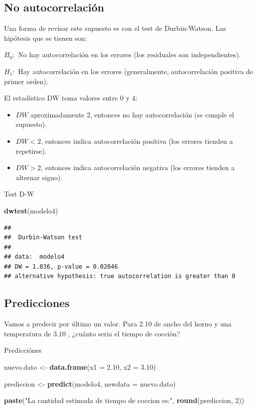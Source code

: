 \documentclass[
]{book}
\newenvironment{Shaded}{\begin{snugshade}}{\end{snugshade}}
\newcommand{\AttributeTok}[1]{\textcolor[rgb]{0.13,0.29,0.53}{#1}}
\newcommand{\DecValTok}[1]{\textcolor[rgb]{0.00,0.00,0.81}{#1}}
\newcommand{\FloatTok}[1]{\textcolor[rgb]{0.00,0.00,0.81}{#1}}
\newcommand{\FunctionTok}[1]{\textcolor[rgb]{0.13,0.29,0.53}{\textbf{#1}}}
\newcommand{\NormalTok}[1]{#1}
\newcommand{\OtherTok}[1]{\textcolor[rgb]{0.56,0.35,0.01}{#1}}
\newcommand{\StringTok}[1]{\textcolor[rgb]{0.31,0.60,0.02}{#1}}
\begin{document}
\subsection{No autocorrelación}\label{no-autocorrelaciuxf3n}

Una forma de revisar este supuesto es con el test de Durbin-Watson. Las hipótesis que se tienen son:

\(H_0:\) No hay autocorrelación en los errores (los residuales son independientes).

\(H_1:\) Hay autocorrelación en los errores (generalmente, autocorrelación positiva de primer orden).

El estadístico DW toma valores entre 0 y 4:

\begin{itemize}
\item
  \(DW\) aproximadamente 2, entonces no hay autocorrelación (se cumple el supuesto).
\item
  \(DW < 2\), entonces indica autocorrelación positiva (los errores tienden a repetirse).
\item
  \(DW > 2\), entonces indica autocorrelación negativa (los errores tienden a alternar signo).
\end{itemize}

Test D-W

\begin{Shaded}
\begin{Highlighting}[]
\FunctionTok{dwtest}\NormalTok{(modelo4)}
\end{Highlighting}
\end{Shaded}

\begin{verbatim}
## 
##  Durbin-Watson test
## 
## data:  modelo4
## DW = 1.036, p-value = 0.02046
## alternative hypothesis: true autocorrelation is greater than 0
\end{verbatim}

\subsection{Predicciones}\label{predicciones}

Vamos a predecir por último un valor. Para \(2.10\) de ancho del horno y una temperatura de \(3.10\) , ¿cuánto seria el tiempo de cocción?

Predicciónes

\begin{Shaded}
\begin{Highlighting}[]
\NormalTok{nuevo.dato }\OtherTok{\textless{}{-}} \FunctionTok{data.frame}\NormalTok{(}\AttributeTok{x1 =} \FloatTok{2.10}\NormalTok{, }\AttributeTok{x2 =} \FloatTok{3.10}\NormalTok{)}

\NormalTok{prediccion }\OtherTok{\textless{}{-}} \FunctionTok{predict}\NormalTok{(modelo4, }\AttributeTok{newdata =}\NormalTok{ nuevo.dato)}

\FunctionTok{paste}\NormalTok{(}\StringTok{"La cantidad estimada de tiempo de coccion es:"}\NormalTok{, }\FunctionTok{round}\NormalTok{(prediccion, }\DecValTok{2}\NormalTok{))}
\end{Highlighting}
\end{Shaded}
\end{document}
